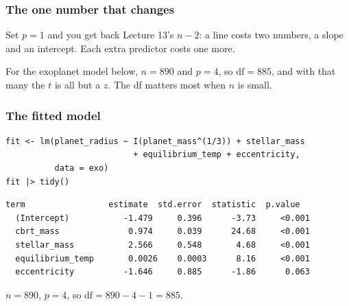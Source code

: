 \documentclass[slidestop,compress,mathserif]{beamer}
\begin{document}
\begin{frame}
\frametitle{The one number that changes}


\pause
\vspace{0.4em}
Set $p = 1$ and you get back Lecture 13's $n-2$: a line costs two numbers, a slope and an intercept. Each extra predictor costs one more.

\pause
\vspace{0.3em}
{\small For the exoplanet model below, $n = 890$ and $p = 4$, so $\mathrm{df} = 885$, and with that many the $t$ is all but a $z$. The df matters most when $n$ is small.}

\end{frame}


\begin{frame}[fragile]
\frametitle{The fitted model}

\begin{Verbatim}[fontsize=\scriptsize]
fit <- lm(planet_radius ~ I(planet_mass^(1/3)) + stellar_mass
                          + equilibrium_temp + eccentricity,
          data = exo)
fit |> tidy()
\end{Verbatim}

\pause
\vspace{0.2em}
\begin{Verbatim}[fontsize=\scriptsize]
  term                 estimate  std.error  statistic  p.value
  (Intercept)           -1.479     0.396      -3.73     <0.001
  cbrt_mass              0.974     0.039      24.68     <0.001
  stellar_mass           2.566     0.548       4.68     <0.001
  equilibrium_temp       0.0026    0.0003      8.16     <0.001
  eccentricity          -1.646     0.885      -1.86      0.063
\end{Verbatim}

\pause
\vspace{0.2em}
{\small $n = 890$, $p = 4$, so $\mathrm{df} = 890 - 4 - 1 = 885$.}

\end{frame}
\end{document}
